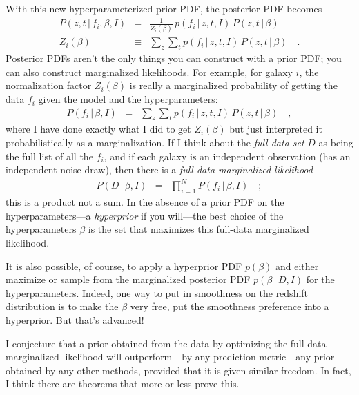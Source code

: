 \documentclass[12pt]{article}
\newcommand{\given}{\,|\,}
\begin{document}
With this new hyper\-parameterized prior PDF, the posterior PDF becomes
\begin{eqnarray}\displaystyle
P(z, t \given f_i, \beta, I) &=&
  \frac{1}{Z_i(\beta)}\,p(f_i \given z, t, I)\,P(z, t \given \beta)
\\
Z_i(\beta) &\equiv& \sum_z\sum_t p(f_i \given z, t, I)\,P(z, t \given \beta)
\quad .
\end{eqnarray}
Posterior PDFs aren't the only things you can construct with a prior
PDF; you can also construct marginalized likelihoods.  For example,
for galaxy $i$, the normalization factor $Z_i(\beta)$ is really a
marginalized probability of getting the data $f_i$ given the model and
the hyper\-parameters:
\begin{eqnarray}\displaystyle
P(f_i \given \beta, I) &=&
  \sum_z\sum_t p(f_i \given z, t, I)\,P(z, t \given \beta)
\quad ,
\end{eqnarray}
where I have done exactly what I did to get $Z_i(\beta)$ but just
interpreted it probabilistically as a marginalization.  If I think
about the \emph{full data set} $D$ as being the full list of all the
$f_i$, and if each galaxy is an independent observation (has an
independent noise draw), then there is a \emph{full-data marginalized
  likelihood}
\begin{eqnarray}\displaystyle
P(D \given \beta, I) &=&
  \prod_{i=1}^N P(f_i \given \beta, I)
\quad ;
\end{eqnarray}
this is a product not a sum.  In the absence of a prior PDF on the
hyper\-parameters---a \emph{hyperprior} if you will---the best choice of
the hyper\-parameters $\beta$ is the set that maximizes this full-data
marginalized likelihood.

It is also possible, of course, to apply a hyper\-prior PDF $p(\beta)$
and either maximize or sample from the marginalized posterior PDF
$p(\beta \given D, I)$ for the hyper\-parameters.  Indeed, one way to
put in smoothness on the redshift distribution is to make the $\beta$
very free, put the smoothness preference into a hyperprior.  But
that's advanced!

I conjecture that a prior obtained from the data by optimizing the
full-data marginalized likelihood will outperform---by any prediction
metric---any prior obtained by any other methods, provided that it is
given similar freedom.  In fact, I think there are theorems that
more-or-less prove this.
\end{document}
